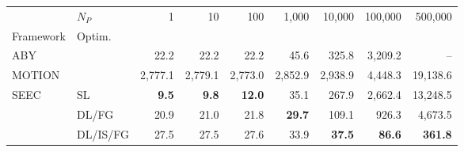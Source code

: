 \begin{tabular}{llrrrrrrr}
\toprule
 & $N_P$ & 1 & 10 & 100 & 1,000 & 10,000 & 100,000 & 500,000 \\
Framework & Optim. &  &  &  &  &  &  &  \\
\midrule
ABY~\cite{DSZ15} &  & 22.2 & 22.2 & 22.2 & 45.6 & 325.8 & 3,209.2 & -- \\
\cline{1-9}
MOTION~\cite{BDST22} &  & 2,777.1 & 2,779.1 & 2,773.0 & 2,852.9 & 2,938.9 & 4,448.3 & 19,138.6 \\
\cline{1-9}
\multirow[c]{3}{*}{SEEC} & SL & \bfseries 9.5 & \bfseries 9.8 & \bfseries 12.0 & 35.1 & 267.9 & 2,662.4 & 13,248.5 \\
 & DL/FG & 20.9 & 21.0 & 21.8 & \bfseries 29.7 & 109.1 & 926.3 & 4,673.5 \\
 & DL/IS/FG & 27.5 & 27.5 & 27.6 & 33.9 & \bfseries 37.5 & \bfseries 86.6 & \bfseries 361.8 \\
\bottomrule
\end{tabular}
